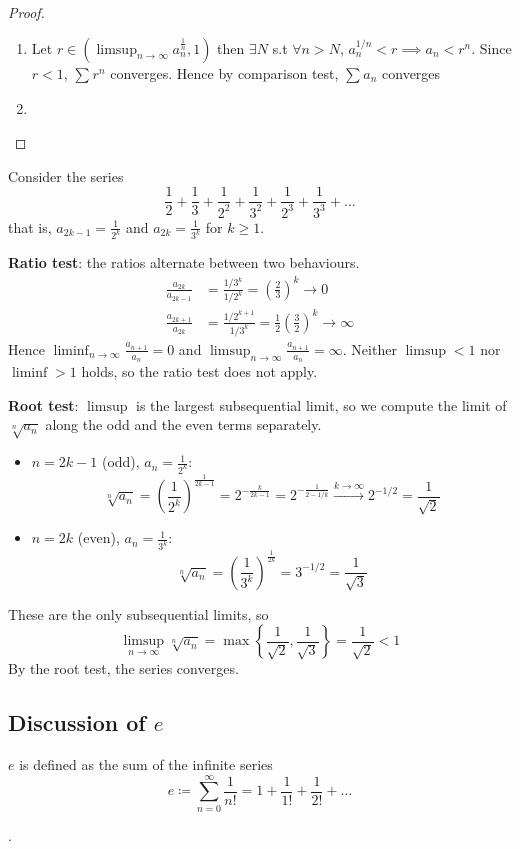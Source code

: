 \begin{proof}
    \begin{enumerate}
        \item Let $r \in \left( \limsup_{n \to \infty} a_n^{ \frac{1}{n}}, 1\right) $
        then $\exists N$ s.t $\forall n > N$,
        $a_n^{1/n} < r \implies a_n < r^{n}$. 
        Since $r < 1$, $\sum\limits_{}^{} r^n$ converges.
        Hence by comparison test, $\sum\limits_{}^{} a_n$ converges
        \item {}
    \end{enumerate} 
\end{proof}

\begin{example}
    Consider the series
    \[
        \frac{1}{2} + \frac{1}{3} + \frac{1}{2^{2}} + \frac{1}{3^{2}}
        + \frac{1}{2^{3}} + \frac{1}{3^{3}} + \hdots
    \]
    that is, $a_{2k-1} = \frac{1}{2^{k}}$ and $a_{2k} = \frac{1}{3^{k}}$
    for $k \geq 1$.
    \medskip

    \textbf{Ratio test}: the ratios alternate between two behaviours.
    \begin{align*}
        \frac{a_{2k}}{a_{2k-1}} &= \frac{1/3^{k}}{1/2^{k}}
        = \left( \frac{2}{3} \right)^{k} \to 0 \\
        \frac{a_{2k+1}}{a_{2k}} &= \frac{1/2^{k+1}}{1/3^{k}}
        = \frac{1}{2} \left( \frac{3}{2} \right)^{k} \to \infty
    \end{align*}
    Hence
    $\liminf_{n \to \infty} \frac{a_{n+1}}{a_n} = 0$ and
    $\limsup_{n \to \infty} \frac{a_{n+1}}{a_n} = \infty$.
    Neither $\limsup < 1$ nor $\liminf > 1$ holds,
    so the ratio test does not apply.
    \medskip

    \textbf{Root test}: $\limsup$ is the largest subsequential limit, 
    so we compute the limit of $\sqrt[n]{a_n}$ along the odd and the even
    terms separately.
    \begin{itemize}
        \item $n = 2k-1$ (odd), $a_n = \frac{1}{2^{k}}$:
        \[
            \sqrt[n]{a_n} = \left( \frac{1}{2^{k}} \right)^{\frac{1}{2k-1}}
            = 2^{-\frac{k}{2k-1}}
            = 2^{-\frac{1}{2 - 1/k}}
            \xrightarrow{k \to \infty} 2^{-1/2} = \frac{1}{\sqrt{2}}
        \]
        \item $n = 2k$ (even), $a_n = \frac{1}{3^{k}}$:
        \[
            \sqrt[n]{a_n} = \left( \frac{1}{3^{k}} \right)^{\frac{1}{2k}}
            = 3^{-1/2} = \frac{1}{\sqrt{3}}
        \]
    \end{itemize}
    These are the only subsequential limits, so
    \[
        \limsup_{n \to \infty} \sqrt[n]{a_n}
        = \max \left\{ \frac{1}{\sqrt{2}}, \frac{1}{\sqrt{3}} \right\}
        = \frac{1}{\sqrt{2}} < 1
    \]
    By the root test, the series converges.
\end{example}


\subsection{Discussion of $e$}

\begin{definition}[$e$]
    $e$ is defined as the sum of the infinite series
    \[
        e \coloneq \sum\limits_{n = 0}^{\infty} \frac{1}{n!}
        = 1 + \frac{1}{1!} + \frac{1}{2!} + \hdots
    \]
\end{definition}

.
